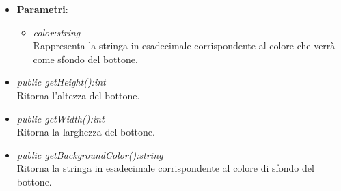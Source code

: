 \begin{itemize}
\begin{itemize}
		\item{\textbf{Parametri}: \begin{itemize}
		\item \textit{color:string}\\
		Rappresenta la stringa in esadecimale corrispondente al colore che verrà come sfondo del bottone.
		\end{itemize}}
	\item \textit{public getHeight():int}\\
	Ritorna l'altezza del bottone.
	\item \textit{public getWidth():int}\\
	Ritorna la larghezza del bottone.
	\item \textit{public getBackgroundColor():string}\\
	Ritorna la stringa in esadecimale corrispondente al colore di sfondo del bottone.
	\end{itemize}
\end{itemize}

